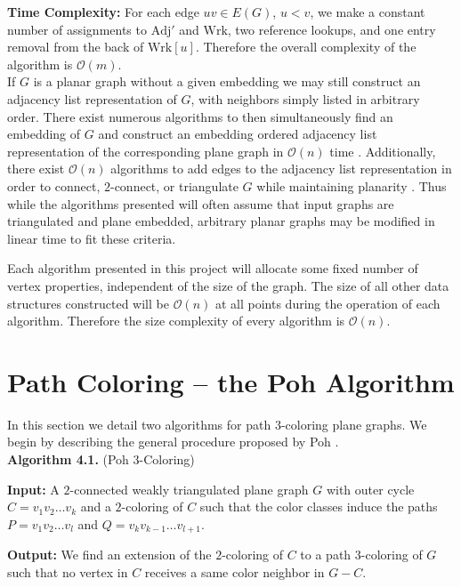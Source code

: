 \documentclass[letterpaper, 12pt]{article}
\theoremstyle{definition}
\theoremstyle{definition}
\theoremstyle{thm}
\theoremstyle{definition}
\begin{document}
\noindent\textbf{Time Complexity:} For each edge $uv\in E(G)$, $u<v$, we make a
constant number of assignments to $\text{Adj}'$ and $\text{Wrk}$, two reference
lookups, and one entry removal from the back of $\text{Wrk}[u]$.
Therefore the overall complexity of the algorithm is $\mathcal{O}(m)$.\\

If $G$ is a planar graph without a given embedding we may still construct an
adjacency list representation of $G$, with neighbors simply listed in arbitrary
order. There exist numerous algorithms to then simultaneously find an embedding
of $G$ and construct an embedding ordered adjacency list representation of the
corresponding plane graph in $\mathcal{O}(n)$ time \cite{tarjan, lempel, boyer,
booth}. Additionally, there exist $\mathcal{O}(n)$ algorithms to add edges
to the adjacency list representation in order to connect, $2$-connect, or
triangulate $G$ while maintaining planarity \cite{hagerup,reed,eswaran}.
Thus while the algorithms presented will often assume that input graphs are
triangulated and plane embedded, arbitrary planar graphs may be modified in
linear time to fit these criteria.

Each algorithm presented in this project will allocate some fixed number
of vertex properties, independent of the size of the graph. The size of all
other data structures constructed will be $\mathcal{O}(n)$ at all points during
the operation of each algorithm. Therefore the size complexity of every
algorithm is $\mathcal{O}(n)$.


\section{Path Coloring -- the Poh Algorithm}

In this section we detail two algorithms for path $3$-coloring plane graphs. We
begin by describing the general procedure proposed by Poh \cite{poh}.\\

\noindent\textbf{Algorithm 4.1.} (Poh $3$-Coloring)

\noindent\textbf{Input:} A $2$-connected weakly triangulated plane graph $G$
with outer cycle $C=v_1v_2\ldots v_k$ and a $2$-coloring of $C$ such that the
color classes induce the paths $P=v_1v_2\ldots v_l$ and
$Q=v_{k}v_{k-1}\ldots v_{l+1}$.

\noindent\textbf{Output:} We find an extension of the $2$-coloring of $C$ to
a path $3$-coloring of $G$ such that no vertex in $C$ receives a same color
neighbor in $G-C$.
\end{document}
